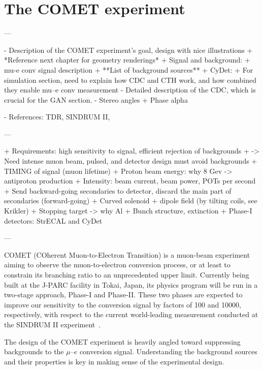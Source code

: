 \chapter{The COMET experiment}\label{chapter2}

\begin{markdown}
---

- Description of the COMET experiment's goal, design with nice illustrations
    + *Reference next chapter for geometry renderings*
    + Signal and background:
        + mu-e conv signal description
        + **List of background sources**
+ CyDet:
    + For simulation section, need to explain how CDC and CTH work, and how combined they enable mu--e conv measurement
    - Detailed description of the CDC, which is crucial for the GAN section.
     - Stereo angles
+ Phase alpha

- References: TDR, SINDRUM II, 

---

+ Requirements: high sensitivity to signal, efficient rejection of backgrounds
 + -> Need intense muon beam, pulsed, and detector design must avoid backgrounds
+ TIMING of signal (muon lifetime)
+ Proton beam energy: why 8 Gev -> antiproton production
+ Intensity: beam current, beam power, POTs per second
+ Send backward-going secondaries to detector, discard the main part of secondaries (forward-going)
+ Curved solenoid + dipole field (by tilting coils, see Krikler)
+ Stopping target -> why Al
+ Bunch structure, extinction
+ Phase-I detectors: StrECAL and CyDet

---
\end{markdown}

COMET (COherent Muon-to-Electron Transition) is a muon-beam experiment aiming to
observe the muon-to-electron conversion process, or at least to constrain its
branching ratio to an unprecedented upper limit. Currently being built at the
J-PARC facility in Tokai, Japan, its physics program will be run in a two-stage
approach, Phase-I and Phase-II. These two phases are expected to improve our
sensitivity to the conversion signal by factors of 100 and \num{10000},
respectively, with respect to the current world-leading measurement conducted at
the SINDRUM II experiment~\cite{Bertl:2006up}.




The design of the COMET experiment is heavily angled toward suppressing
backgrounds to the $\mu$--$e$ conversion signal. Understanding the background
sources and their properties is key in making sense of the experimental design.

